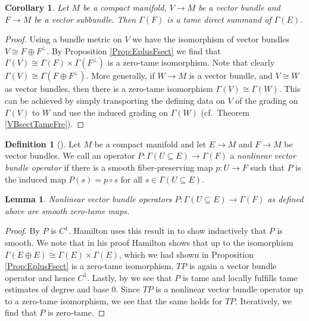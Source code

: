\documentclass[12pt,a4paper]{article}
\theoremstyle{plain}
\newtheorem{corollary}[theorem]{Corollary}
\newtheorem{lemma}[theorem]{Lemma}
\theoremstyle{definition}
\newtheorem{definition}[theorem]{Definition}
\begin{document}
\begin{corollary}
\label{Cor:FsubbundleE->FtameDirectSummand}
Let $M$ be a compact manifold, $V\to M$ be a vector bundle and $F\to M$ be a vector subbundle. Then $\Gamma(F)$ is a tame direct summand of $\Gamma(E)$.
\end{corollary}
\begin{proof}
Using a bundle metric on $V$ we have the isomorphism of vector bundles  
$V\cong F\oplus F^\bot$. By Proposition \ref{Prop:EplusFsect} we find that $\Gamma(V)\cong\Gamma(F)\times \Gamma(F^\bot)$ is a zero-tame isomorphism. Note that clearly $\Gamma(V)\cong \Gamma(F\oplus F^\perp)$. More generally, if $W\to M$ is a vector bundle, and $V\cong W$ as vector bundles, then there is a zero-tame isomorphism $\Gamma(V)\cong \Gamma(W)$. This can be achieved by simply transporting the defining data on $V$ of the grading on $\Gamma(V)$ to $W$ and use the induced grading on $\Gamma(W)$ (cf.~Theorem \ref{VBsectTameFre}).
\end{proof}







\begin{definition}[{\cite[Part I, Example 3.1.7]{hamilton}}]
\label{Def:VBop}
Let $M$ be a compact manifold and let $E\to M$ and $F\to M$ be vector bundles. We call an operator $P:\Gamma(U\subseteq E)\to \Gamma(F)$ a \textit{nonlinear vector bundle operator} if there is a smooth fiber-preserving map
$p:U\to F$ such that $P$ is the induced map $P(s)=p\circ s$ for all $s\in \Gamma(U\subseteq E)$. 
\end{definition}

\begin{lemma}
\label{VBopSmoothTame}
Nonlinear vector bundle operators $P:\Gamma(U\subseteq E)\to \Gamma(F)$ as defined above are smooth zero-tame maps.
\end{lemma}
\begin{proof}
By \cite[Part I, Example 3.3.3]{hamilton} $P$ is $C^1$.
Hamilton uses this result in \cite[Part I, Example 3.6.5]{hamilton} to show inductively that $P$ is smooth. We note that in his proof Hamilton shows that up to the isomorphism $\Gamma(E\oplus E)\cong \Gamma(E)\times\Gamma(E)$, which we had shown in Proposition \ref{Prop:EplusFsect} is a zero-tame isomorphism, $TP$ is again a vector bundle operator and hence $C^1$.
Lastly, by \cite[Part II, Theorem 2.2.6]{hamilton} we see that $P$ is tame and locally fulfills tame estimates of degree and base $0$. Since $TP$ is a nonlinear vector bundle operator up to a zero-tame isomorphism, we see that the same holds for $TP$. Iteratively, we find that $P$ is zero-tame.
\end{proof}
\end{document}
